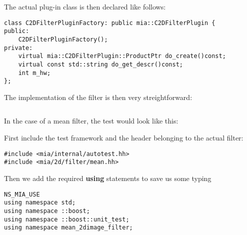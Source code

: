 \documentclass[english, 10pt, a4paper,headsepline,openany]{scrbook}
\begin{document}
The actual plug-in class is then declared like follows: 
\begin{lstlisting}[MeanFilterHeader]
class C2DFilterPluginFactory: public mia::C2DFilterPlugin {
public:
	C2DFilterPluginFactory();
private:
	virtual mia::C2DFilterPlugin::ProductPtr do_create()const;
	virtual const std::string do_get_descr()const;
	int m_hw;
};
\end{lstlisting}

The implementation of the filter is then very streightforward: 
\begin{lstlisting}[MeanFilterCode]

\end{lstlisting}





In the case of a mean filter, the test would look like this: 

First include the test framework and the header belonging to the actual filter: 
\lstset{numbers=left,firstnumber=auto}
\begin{lstlisting}[MeanFilterExample]
#include <mia/internal/autotest.hh>
#include <mia/2d/filter/mean.hh>
\end{lstlisting}

\noindent
Then we add the required {\bf using} statements to save us some typing
\begin{lstlisting}[MeanFilterExample]
NS_MIA_USE
using namespace std;
using namespace ::boost;
using namespace ::boost::unit_test;
using namespace mean_2dimage_filter;
\end{lstlisting}
\end{document}
